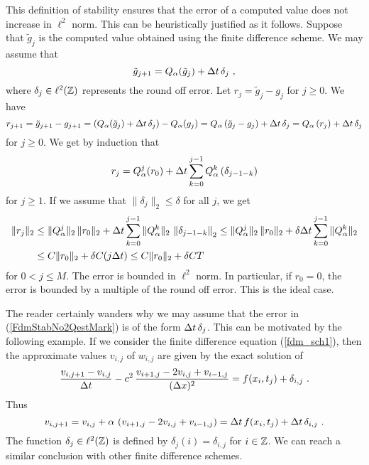 This definition of stability ensures that the error of a computed
value does not increase in $\ell^2$ norm.  This can be heuristically
justified as it follows.  Suppose that $\tilde{g}_j$ is the computed
value obtained using the finite difference scheme.  We may assume that
\begin{equation}\label{FdmStabNo2QestMark}
  \tilde{g}_{j+1} = Q_\alpha(\tilde{g}_j) + \dtx{t}\, \delta_j \ ,
\end{equation}
where $\delta_j \in \ell^2(\mathbb{Z})$ represents the round off error.
Let $r_j = \tilde{g}_j - g_j$ for $j\geq 0$.  We have
\[
r_{j+1} = \tilde{g}_{j+1} - g_{j+1}
= \left( Q_\alpha (\tilde{g}_j) + \Delta{t} \, \delta_j \right) - Q_\alpha (g_j)
= Q_\alpha \left( \tilde{g}_j - g_j\right)+ \Delta{t} \, \delta_j
= Q_\alpha \left(r_j\right) + \Delta{t} \, \delta_j
\]
for $j\geq 0$.  We get by induction that
\[
r_j = Q_\alpha^j (r_0)
+ \Delta{t} \sum_{k=0}^{j-1} Q_\alpha^k \left(\delta_{j-1-k}\right)
\]
for $j \geq 1$.  If we assume that $\|\delta_j\|_2 \leq \delta$
for all $j$, we get
\begin{align*}
\|r_j\|_2 & \leq \| Q_\alpha^j\|_2 \, \|r_0\|_2
+ \Delta{t} \sum_{k=0}^{j-1} \|Q_\alpha^k\|_2\, \left\|\delta_{j-1-k}\right\|_2
\leq \| Q_\alpha^j\|_2 \, \|r_0\|_2
+ \delta  \Delta{t} \sum_{k=0}^{j-1} \|Q_\alpha^k\|_2 \\
&\leq C \|r_0\|_2 + \delta C (j \Delta{t})
\leq C \|r_0\|_2 + \delta C T
\end{align*}
for $0 < j \leq M$.  The error is bounded in $\ell^2$ norm.  In
particular, if $r_0 = 0$, the error is bounded by a
multiple of the round off error.  This is the ideal case.

\begin{rmk}
The reader certainly wanders why we may assume that the error in
(\ref{FdmStabNo2QestMark}) is of the form $\Delta{t}\, \delta_j$.
This can be motivated by the following example.  If we consider the
finite difference equation (\ref{fdm_sch1}), then the approximate
values $v_{i,j}$ of $w_{i,j}$ are given by the exact solution of
\[
\frac{v_{i,j+1}- v_{i,j}}{\Delta{t}} - c^2 \,
\frac{v_{i+1,j} - 2v_{i,j} + v_{i-1,j}}{(\Delta{x})^2}
= f(x_i,t_j) + \delta_{i,j} \ .
\]
Thus
\[
v_{i,j+1}= v_{i,j} + \alpha \,
\left( v_{i+1,j} - 2v_{i,j} + v_{i-1,j}\right) = \Delta{t}\,f(x_i,t_j)
+ \Delta{t}\, \delta_{i,j} \ .
\]
The function $\delta_j \in \ell^2(\mathbb{Z})$ is defined by
$\delta_j(i) = \delta_{i,j}$ for $i \in \mathbb{Z}$.
We can reach a similar conclusion with other finite difference schemes.
\end{rmk}

